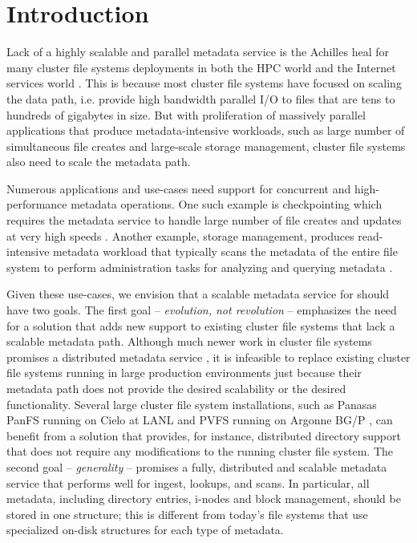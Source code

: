 \section{Introduction}

Lack of a highly scalable and parallel metadata service is the 
Achilles heal for many cluster file systems deployments in both the HPC world 
and the Internet services world \citep{hecfsio:tr06, hpcs-io:2008}.
This is because most cluster file systems have focused on scaling the
data path, i.e. provide high bandwidth parallel I/O to files that are tens to
hundreds of gigabytes in size.
But with proliferation of massively parallel applications that produce 
metadata-intensive workloads, such as large number of simultaneous file creates
and large-scale storage management, cluster file systems also need to scale the
metadata path.

Numerous applications and use-cases need support for concurrent and 
high-performance metadata operations.
One such example is checkpointing which requires the metadata service to
handle large number of file creates and updates at very high speeds 
\cite{PLFS}.
Another example, storage management, produces read-intensive metadata workload
that typically scans the metadata of the entire file system to perform
administration tasks for analyzing and querying metadata \cite{issdm}.

Given these use-cases, we envision that a scalable metadata service for 
should have two goals. 
The first goal -- \textit{evolution, not revolution} -- emphasizes the need for
a solution that adds new support to existing cluster file systems that lack a 
scalable metadata path.
Although much newer work in cluster file systems promises a distributed
metadata service \cite{ceph:weil06, 50mfiles-in-googlefs:fikes10}, it is
infeasible to replace existing cluster file systems running in large production
environments just because their metadata path does not provide the desired
scalability or the desired functionality.
Several large cluster file system installations, such as Panasas PanFS running
on Cielo at LANL \cite{panfs:welch08,cielo} and PVFS running on Argonne BG/P 
\cite{pvfs:www,bgp}, can 
benefit from a solution that provides, for instance, distributed directory support 
that does not require any modifications to the running cluster file system.
The second goal -- \textit{generality} -- promises a fully, distributed and
scalable metadata service that performs well for ingest, lookups, and scans.
In particular, all metadata, including directory entries, i-nodes and block
management, should be stored in one structure; this is different from
today's file systems that use specialized on-disk structures for each type of 
metadata.

